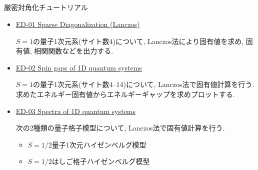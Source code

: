 \subsection*{\redm\whiteb\greenm}
\begin{frame}[t,fragile]{厳密対角化チュートリアル}
  \begin{itemize}
  \item \href{http://alps.comp-phys.org/mediawiki/index.php/ALPS_2_Tutorials:ED-01_SparseDiagonalization/ja}{ED-01 Sparse Diagonalization (Lanczos)
}

    $S=1$の量子1次元系(サイト数4)について, Lanczos法により固有値を求め, 固有値, 相関関数などを出力する.

  \item \href{http://alps.comp-phys.org/mediawiki/index.php/ALPS_2_Tutorials:ED-02_Gaps/ja}{ED-02 Spin gaps of 1D quantum systems}
    
    $S=1$の量子1次元系(サイト数4--14)について, Lanczos法で固有値計算を行う. 求めたエネルギー固有値からエネルギーギャップを求めプロットする.

  \item \href{http://alps.comp-phys.org/mediawiki/index.php/ALPS_2_Tutorials:ED-03_Spectra/ja}{ED-03 Spectra of 1D quantum systems}

    次の2種類の量子格子模型について, Lanczos法で固有値計算を行う.
    \begin{itemize}
      \item $S=1/2$量子1次元ハイゼンベルグ模型
      \item $S=1/2$はしご格子ハイゼンベルグ模型
    \end{itemize}
  \end{itemize}
\end{frame}

